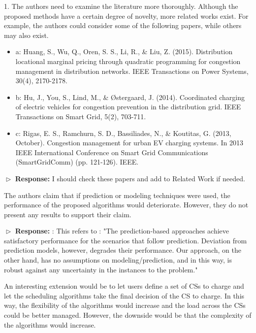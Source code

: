 \documentclass[11pt]{article}
\begin{document}
\vspace{3mm}
{\color{blue} 1.      The authors need to examine the literature more thoroughly. Although the proposed methods have a certain degree of novelty, more related works exist. For example, the authors could consider some of the following papers, while others may also exist.

\begin{itemize}
\item a: Huang, S., Wu, Q., Oren, S. S., Li, R., \& Liu, Z. (2015). Distribution locational marginal pricing through quadratic programming for congestion management in distribution networks. IEEE Transactions on Power Systems, 30(4), 2170-2178.

\item b: Hu, J., You, S., Lind, M., \& Østergaard, J. (2014). Coordinated charging of electric vehicles for congestion prevention in the distribution grid. IEEE Transactions on Smart Grid, 5(2), 703-711.

\item c: Rigas, E. S., Ramchurn, S. D., Bassiliades, N., \& Koutitas, G. (2013, October). Congestion management for urban EV charging systems. In 2013 IEEE International Conference on Smart Grid Communications (SmartGridComm) (pp. 121-126). IEEE.

\end{itemize}
}
\vspace{3mm}

$\vartriangleright$ \noindent\textbf{Response:} 
{\color{red} I should check these papers and add to Related Work if needed.}

\vspace{3mm}
{\color{blue} The authors claim that if prediction or modeling techniques were used, the performance of the proposed algorithms would deteriorate. However, they do not present any results to support their claim.  }
\vspace{3mm}

$\vartriangleright$ \noindent\textbf{Response:} 
{\color{red}: This refers to : "The prediction-based approaches achieve satisfactory
performance for the scenarios that follow prediction. Deviation
from prediction models, however, degrades their performance.
Our approach, on the other hand, has no assumptions on
modeling/prediction, and in this way, is robust against any
uncertainty in the instances to the problem."}

\vspace{3mm}
{\color{blue} An interesting extension would be to let users define a set of CSs to charge and let the scheduling algorithms take the final decision of the CS to charge. In this way, the flexibility of the algorithms would increase and the load across the CSs could be better managed. However, the downside would be that the complexity of the algorithms would increase. }
\vspace{3mm}
\end{document}
